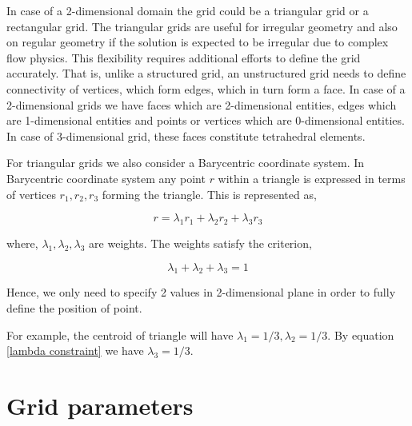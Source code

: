 \documentclass[a4paper,12pt]{book}
\begin{document}
In case of a 2-dimensional domain the grid could be a triangular grid or a rectangular grid. The triangular grids are useful for irregular geometry and also on regular geometry if the solution is expected to be irregular due to complex flow physics. This flexibility requires additional efforts to define the grid accurately. That is, unlike a structured grid, an unstructured grid needs to define connectivity of vertices, which form edges, which in turn form a face. In case of a 2-dimensional grids we have faces which are 2-dimensional entities, edges which are 1-dimensional entities and points or vertices which are 0-dimensional entities. In case of 3-dimensional grid, these faces constitute tetrahedral elements. 

For triangular grids we also consider a Barycentric coordinate system. In Barycentric coordinate system any point $r$ within a triangle is expressed in terms of vertices $r_1,r_2,r_3$ forming the triangle. This is represented as,

\begin{equation}\label{barycentric point}
r = \lambda_1 r_1 + \lambda_2 r_2 + \lambda_3 r_3
\end{equation}

where, $\lambda_1, \lambda_2, \lambda_3$ are weights. The weights satisfy the criterion,

\begin{equation}\label{lambda constraint}
\lambda_1 + \lambda_2 + \lambda_3 = 1
\end{equation}

Hence, we only need to specify 2 values in 2-dimensional plane in order to fully define the position of point.

For example, the centroid of triangle will have $\lambda_1 = 1/3, \lambda_2 = 1/3$. By equation \eqref{lambda constraint} we have $\lambda_3=1/3$.

\section{Grid parameters}
\end{document}
